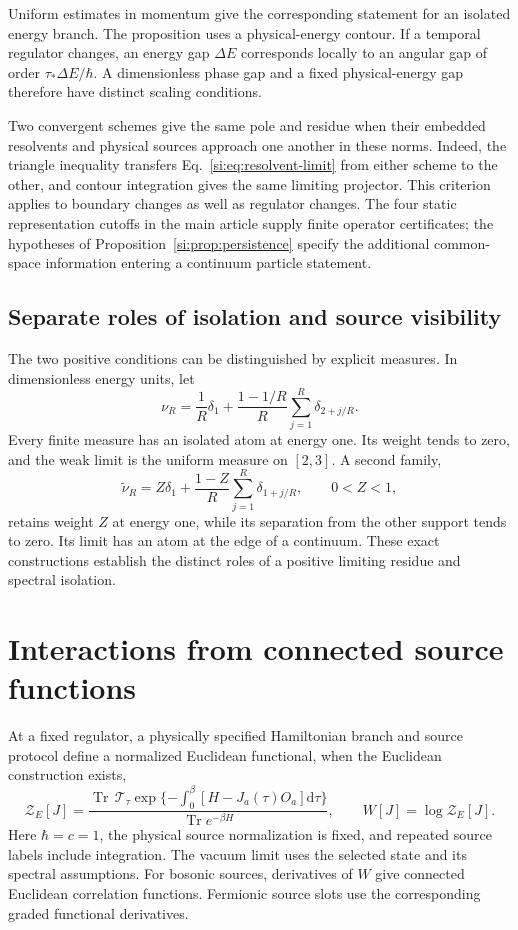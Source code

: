 \documentclass[11pt,a4paper]{article}
\newcommand{\dd}{\mathrm{d}}\DeclareMathOperator{\Tr}{Tr}
\begin{document}
Uniform estimates in momentum give the corresponding statement for an isolated energy branch. The proposition uses a physical-energy contour. If a temporal regulator changes, an energy gap $\Delta E$ corresponds locally to an angular gap of order $\tau_*\Delta E/\hbar$. A dimensionless phase gap and a fixed physical-energy gap therefore have distinct scaling conditions.

Two convergent schemes give the same pole and residue when their embedded resolvents and physical sources approach one another in these norms. Indeed, the triangle inequality transfers Eq.~\eqref{si:eq:resolvent-limit} from either scheme to the other, and contour integration gives the same limiting projector. This criterion applies to boundary changes as well as regulator changes. The four static representation cutoffs in the main article supply finite operator certificates; the hypotheses of Proposition~\ref{si:prop:persistence} specify the additional common-space information entering a continuum particle statement.

\subsection{Separate roles of isolation and source visibility}
The two positive conditions can be distinguished by explicit measures. In dimensionless energy units, let
\[
\nu_R=\frac1R\delta_1+\frac{1-1/R}{R}\sum_{j=1}^R\delta_{2+j/R}.
\]
Every finite measure has an isolated atom at energy one. Its weight tends to zero, and the weak limit is the uniform measure on $[2,3]$. A second family,
\[
\widetilde\nu_R=Z\delta_1+\frac{1-Z}{R}\sum_{j=1}^R\delta_{1+j/R},\qquad0<Z<1,
\]
retains weight $Z$ at energy one, while its separation from the other support tends to zero. Its limit has an atom at the edge of a continuum. These exact constructions establish the distinct roles of a positive limiting residue and spectral isolation.

\section{Interactions from connected source functions}
\label{si:vertices}
At a fixed regulator, a physically specified Hamiltonian branch and source protocol define a normalized Euclidean functional, when the Euclidean construction exists,
\begin{equation}\label{si:eq:generating-functional}
\mathcal Z_E[J]=\frac{\Tr\,\mathcal T_\tau\exp\{-\int_0^\beta[H-J_a(\tau)O_a]\dd\tau\}}{\Tr e^{-\beta H}},
\qquad W[J]=\log\mathcal Z_E[J].
\end{equation}
Here $\hbar=c=1$, the physical source normalization is fixed, and repeated source labels include integration. The vacuum limit uses the selected state and its spectral assumptions. For bosonic sources, derivatives of $W$ give connected Euclidean correlation functions. Fermionic source slots use the corresponding graded functional derivatives.
\end{document}
